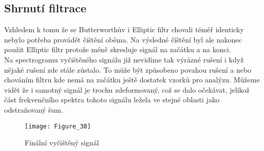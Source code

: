 \subsection{Shrnutí filtrace}
Vzhledem k tomu že se Butterworthův i Elliptic filtr chovali téměř identicky nebylo potřeba provádět čištění oběma.
Na výsledné číštění byl ale nakonec použit Elliptic filtr protože méně zkresluje signál na začátku a na konci.\\
Na spectrogramu vyčištěného signálu již nevidíme tak výrázné rušení i když nějaké rušení zde stále zůstalo. To může být způsobeno povahou rušení a nebo chováním filtru kde nemá na začátku ještě dostatek vzorků pro analýzu.
Můžeme vidět že i samotný signál je trochu zdeformovaný, což se dalo očekávat, jelikož část frekvenčního spektra tohoto signálu ležela ve stejné oblasti jako odstraňovaný šum.

\begin{landscape}
	\begin{figure}[H] 
		\centering
		\texttt{[image: Figure\_30]}
		\caption{Finální vyčištěný signál}
	\end{figure}
\end{landscape}
